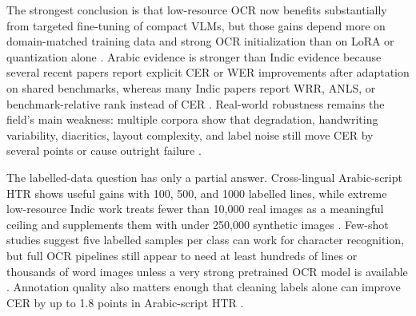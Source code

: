     
    The strongest conclusion is that low-resource OCR now benefits substantially from targeted fine-tuning of compact VLMs, but those gains depend more on domain-matched training data and strong OCR initialization than on LoRA or quantization alone  \cite{Faraz2026Designing} \cite{Elkousy2026Domain-Specific} \cite{Hennara2025Baseer:}. Arabic evidence is stronger than Indic evidence because several recent papers report explicit CER or WER improvements after adaptation on shared benchmarks, whereas many Indic papers report WRR, ANLS, or benchmark-relative rank instead of CER  \cite{Wasfy2025QARI-OCR:} \cite{Hennara2025Baseer:} \cite{Faraz2026Designing} \cite{Achyuth2026What}. Real-world robustness remains the field’s main weakness: multiple corpora show that degradation, handwriting variability, diacritics, layout complexity, and label noise still move CER by several points or cause outright failure  \cite{Al-Azzawi2026A} \cite{Al-Azzawi2026Performance} \cite{Farazi2026When}.
    
    
    The labelled-data question has only a partial answer. Cross-lingual Arabic-script HTR shows useful gains with 100, 500, and 1000 labelled lines, while extreme low-resource Indic work treats fewer than 10,000 real images as a meaningful ceiling and supplements them with under 250,000 synthetic images  \cite{Al-Azzawi2026Cross-Lingual} \cite{Achyuth2026What}. Few-shot studies suggest five labelled samples per class can work for character recognition, but full OCR pipelines still appear to need at least hundreds of lines or thousands of word images unless a very strong pretrained OCR model is available  \cite{Chandrashekar2025Applying} \cite{Evani2025SemiHastakshar:}. Annotation quality also matters enough that cleaning labels alone can improve CER by up to 1.8 points in Arabic-script HTR  \cite{Al-Azzawi2026A}.
    
